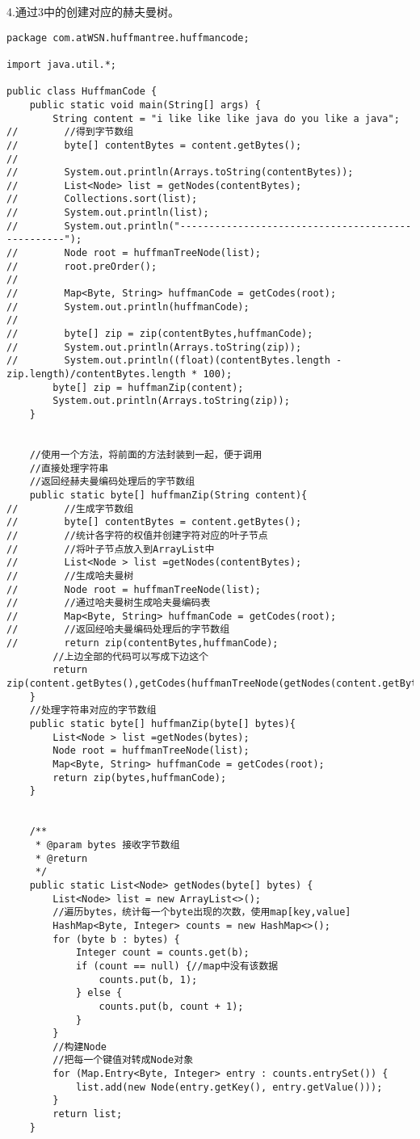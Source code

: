 \documentclass[a4paper]{report}
\begin{document}
4.通过3中的创建对应的赫夫曼树。
\begin{lstlisting}
package com.atWSN.huffmantree.huffmancode;

import java.util.*;

public class HuffmanCode {
    public static void main(String[] args) {
        String content = "i like like like java do you like a java";
//        //得到字节数组
//        byte[] contentBytes = content.getBytes();
//
//        System.out.println(Arrays.toString(contentBytes));
//        List<Node> list = getNodes(contentBytes);
//        Collections.sort(list);
//        System.out.println(list);
//        System.out.println("--------------------------------------------------");
//        Node root = huffmanTreeNode(list);
//        root.preOrder();
//
//        Map<Byte, String> huffmanCode = getCodes(root);
//        System.out.println(huffmanCode);
//
//        byte[] zip = zip(contentBytes,huffmanCode);
//        System.out.println(Arrays.toString(zip));
//        System.out.println((float)(contentBytes.length - zip.length)/contentBytes.length * 100);
        byte[] zip = huffmanZip(content);
        System.out.println(Arrays.toString(zip));
    }


    //使用一个方法，将前面的方法封装到一起，便于调用
    //直接处理字符串
    //返回经赫夫曼编码处理后的字节数组
    public static byte[] huffmanZip(String content){
//        //生成字节数组
//        byte[] contentBytes = content.getBytes();
//        //统计各字符的权值并创建字符对应的叶子节点
//        //将叶子节点放入到ArrayList中
//        List<Node > list =getNodes(contentBytes);
//        //生成哈夫曼树
//        Node root = huffmanTreeNode(list);
//        //通过哈夫曼树生成哈夫曼编码表
//        Map<Byte, String> huffmanCode = getCodes(root);
//        //返回经哈夫曼编码处理后的字节数组
//        return zip(contentBytes,huffmanCode);
        //上边全部的代码可以写成下边这个
        return zip(content.getBytes(),getCodes(huffmanTreeNode(getNodes(content.getBytes()))));
    }
    //处理字符串对应的字节数组
    public static byte[] huffmanZip(byte[] bytes){
        List<Node > list =getNodes(bytes);
        Node root = huffmanTreeNode(list);
        Map<Byte, String> huffmanCode = getCodes(root);
        return zip(bytes,huffmanCode);
    }


    /**
     * @param bytes 接收字节数组
     * @return
     */
    public static List<Node> getNodes(byte[] bytes) {
        List<Node> list = new ArrayList<>();
        //遍历bytes，统计每一个byte出现的次数，使用map[key,value]
        HashMap<Byte, Integer> counts = new HashMap<>();
        for (byte b : bytes) {
            Integer count = counts.get(b);
            if (count == null) {//map中没有该数据
                counts.put(b, 1);
            } else {
                counts.put(b, count + 1);
            }
        }
        //构建Node
        //把每一个键值对转成Node对象
        for (Map.Entry<Byte, Integer> entry : counts.entrySet()) {
            list.add(new Node(entry.getKey(), entry.getValue()));
        }
        return list;
    }


\end{lstlisting}
\end{document}
